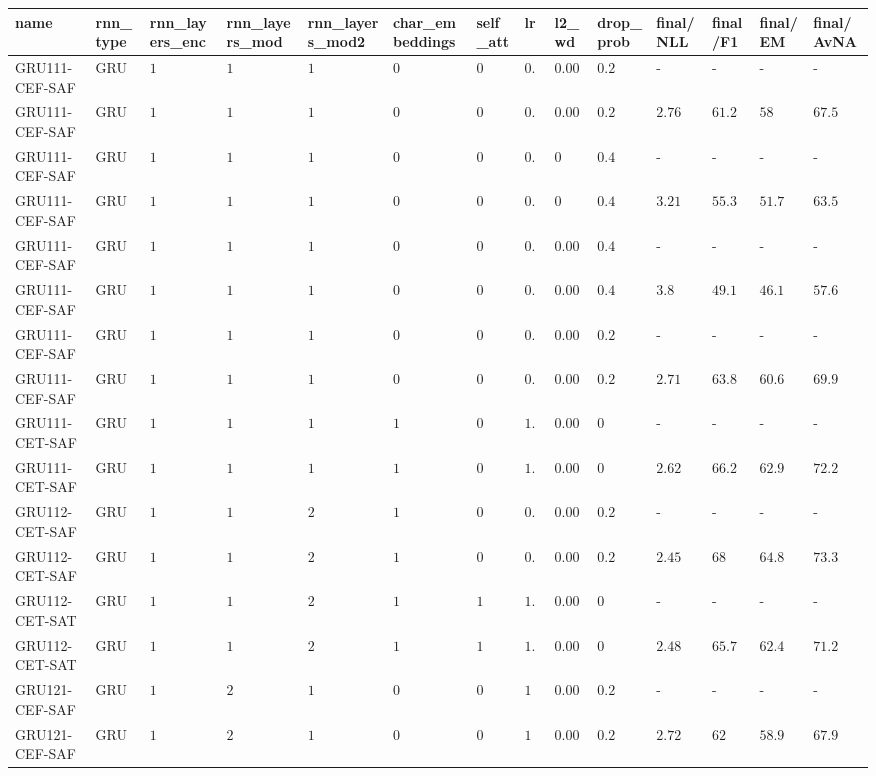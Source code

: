 \begin{table}[tbp]
\begin{tabular}{llllllllllllll}
name & rnn\_type & rnn\_layers\_enc & rnn\_layers\_mod & rnn\_layers\_mod2 & char\_embeddings & self\_att & lr & l2\_wd & drop\_prob & final/NLL & final/F1 & final/EM & final/AvNA \\ \hline
GRU111-CEF-SAF & GRU & $1$ & $1$ & $1$ & $0$ & $0$ & $0.5$ & $0.001$ & $0.2$ & - & - & - & - \\
GRU111-CEF-SAF & GRU & $1$ & $1$ & $1$ & $0$ & $0$ & $0.5$ & $0.001$ & $0.2$ & $2.76$ & $61.2$ & $58$ & $67.5$ \\
GRU111-CEF-SAF & GRU & $1$ & $1$ & $1$ & $0$ & $0$ & $0.75$ & $0$ & $0.4$ & - & - & - & - \\
GRU111-CEF-SAF & GRU & $1$ & $1$ & $1$ & $0$ & $0$ & $0.75$ & $0$ & $0.4$ & $3.21$ & $55.3$ & $51.7$ & $63.5$ \\
GRU111-CEF-SAF & GRU & $1$ & $1$ & $1$ & $0$ & $0$ & $0.5$ & $0.005$ & $0.4$ & - & - & - & - \\
GRU111-CEF-SAF & GRU & $1$ & $1$ & $1$ & $0$ & $0$ & $0.5$ & $0.005$ & $0.4$ & $3.8$ & $49.1$ & $46.1$ & $57.6$ \\
GRU111-CEF-SAF & GRU & $1$ & $1$ & $1$ & $0$ & $0$ & $0.5$ & $0.0005$ & $0.2$ & - & - & - & - \\
GRU111-CEF-SAF & GRU & $1$ & $1$ & $1$ & $0$ & $0$ & $0.5$ & $0.0005$ & $0.2$ & $2.71$ & $63.8$ & $60.6$ & $69.9$ \\
GRU111-CET-SAF & GRU & $1$ & $1$ & $1$ & $1$ & $0$ & $1.2$ & $0.0001$ & $0$ & - & - & - & - \\
GRU111-CET-SAF & GRU & $1$ & $1$ & $1$ & $1$ & $0$ & $1.2$ & $0.0001$ & $0$ & $2.62$ & $66.2$ & $62.9$ & $72.2$ \\
GRU112-CET-SAF & GRU & $1$ & $1$ & $2$ & $1$ & $0$ & $0.5$ & $0.0005$ & $0.2$ & - & - & - & - \\
GRU112-CET-SAF & GRU & $1$ & $1$ & $2$ & $1$ & $0$ & $0.5$ & $0.0005$ & $0.2$ & $2.45$ & $68$ & $64.8$ & $73.3$ \\
GRU112-CET-SAT & GRU & $1$ & $1$ & $2$ & $1$ & $1$ & $1.2$ & $0.0005$ & $0$ & - & - & - & - \\
GRU112-CET-SAT & GRU & $1$ & $1$ & $2$ & $1$ & $1$ & $1.2$ & $0.0005$ & $0$ & $2.48$ & $65.7$ & $62.4$ & $71.2$ \\
GRU121-CEF-SAF & GRU & $1$ & $2$ & $1$ & $0$ & $0$ & $1$ & $0.0005$ & $0.2$ & - & - & - & - \\
GRU121-CEF-SAF & GRU & $1$ & $2$ & $1$ & $0$ & $0$ & $1$ & $0.0005$ & $0.2$ & $2.72$ & $62$ & $58.9$ & $67.9$ \\

\end{tabular}
\end{table}
